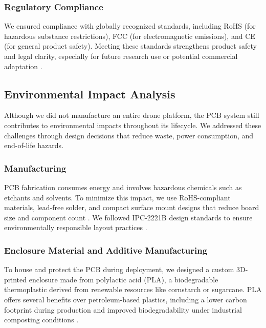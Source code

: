 \documentclass[12pt]{article}
\begin{document}
\subsubsection{Regulatory Compliance}

\par We ensured compliance with globally recognized standards, including RoHS (for hazardous substance restrictions), FCC (for electromagnetic emissions), and CE (for general product safety). Meeting these standards strengthens product safety and legal clarity, especially for future research use or potential commercial adaptation \cite{rohs}.

\subsection{Environmental Impact Analysis}

\par Although we did not manufacture an entire drone platform, the PCB system still contributes to environmental impacts throughout its lifecycle. We addressed these challenges through design decisions that reduce waste, power consumption, and end-of-life hazards.

\subsubsection{Manufacturing}

\par PCB fabrication consumes energy and involves hazardous chemicals such as etchants and solvents. To minimize this impact, we use RoHS-compliant materials, lead-free solder, and compact surface mount designs that reduce board size and component count \cite{rohs}. We followed IPC-2221B design standards to ensure environmentally responsible layout practices \cite{ipc2221}.

\subsubsection{Enclosure Material and Additive Manufacturing}

\par To house and protect the PCB during deployment, we designed a custom 3D-printed enclosure made from polylactic acid (PLA), a biodegradable thermoplastic derived from renewable resources like cornstarch or sugarcane. PLA offers several benefits over petroleum-based plastics, including a lower carbon footprint during production and improved biodegradability under industrial composting conditions \cite{natureworks_pla}.
\end{document}
